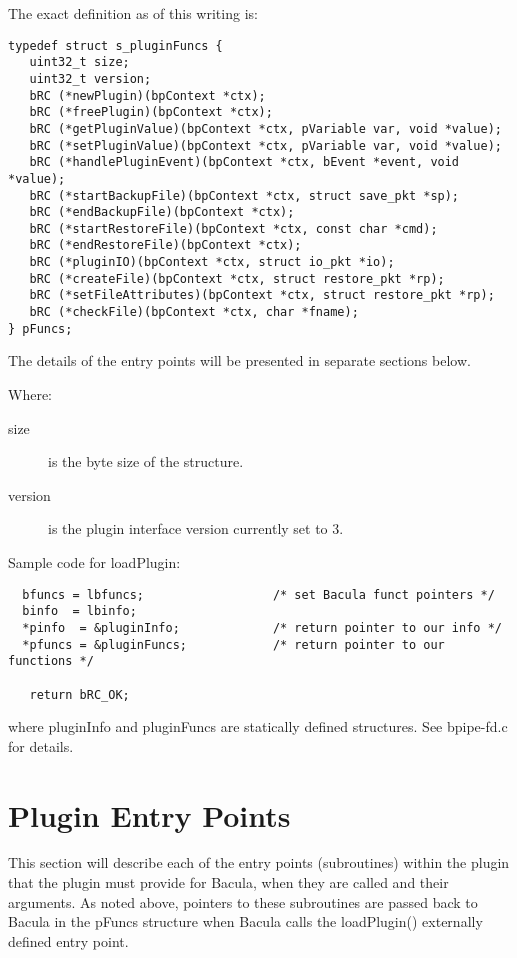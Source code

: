 \begin{description}
The exact definition as of this writing is:

\begin{verbatim}
typedef struct s_pluginFuncs {
   uint32_t size;
   uint32_t version;
   bRC (*newPlugin)(bpContext *ctx);
   bRC (*freePlugin)(bpContext *ctx);
   bRC (*getPluginValue)(bpContext *ctx, pVariable var, void *value);
   bRC (*setPluginValue)(bpContext *ctx, pVariable var, void *value);
   bRC (*handlePluginEvent)(bpContext *ctx, bEvent *event, void *value);
   bRC (*startBackupFile)(bpContext *ctx, struct save_pkt *sp);
   bRC (*endBackupFile)(bpContext *ctx);
   bRC (*startRestoreFile)(bpContext *ctx, const char *cmd);
   bRC (*endRestoreFile)(bpContext *ctx);
   bRC (*pluginIO)(bpContext *ctx, struct io_pkt *io);
   bRC (*createFile)(bpContext *ctx, struct restore_pkt *rp);
   bRC (*setFileAttributes)(bpContext *ctx, struct restore_pkt *rp);
   bRC (*checkFile)(bpContext *ctx, char *fname);
} pFuncs;
\end{verbatim}

The details of the entry points will be presented in
separate sections below. 

Where:
 \begin{description}
 \item [size] is the byte size of the structure.
 \item [version] is the plugin interface version currently set to 3.
 \end{description}

Sample code for loadPlugin:
\begin{verbatim}
  bfuncs = lbfuncs;                  /* set Bacula funct pointers */
  binfo  = lbinfo;
  *pinfo  = &pluginInfo;             /* return pointer to our info */
  *pfuncs = &pluginFuncs;            /* return pointer to our functions */

   return bRC_OK;
\end{verbatim}

where pluginInfo and pluginFuncs are statically defined structures. 
See bpipe-fd.c for details.



\end{description}

\section{Plugin Entry Points}
This section will describe each of the entry points (subroutines) within
the plugin that the plugin must provide for Bacula, when they are called
and their arguments. As noted above, pointers to these subroutines are
passed back to Bacula in the pFuncs structure when Bacula calls the 
loadPlugin() externally defined entry point.


